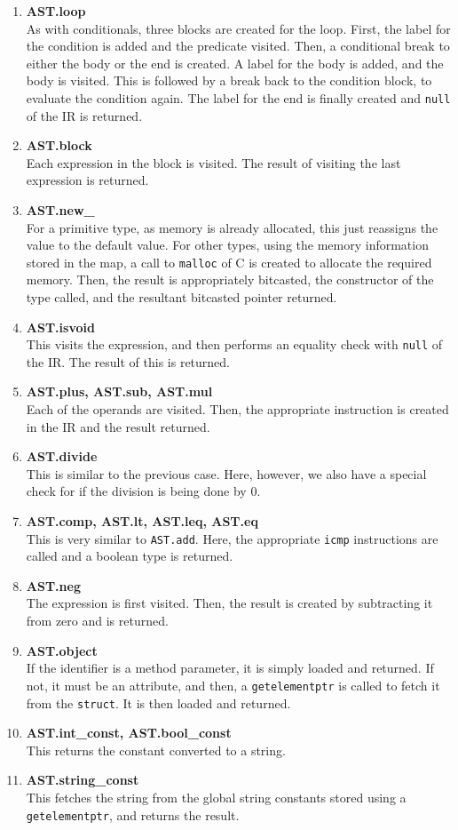 \documentclass{article}
\begin{document}
\begin{enumerate}
	\item \textbf{AST.loop} \\
	As with conditionals, three blocks are created for the loop. First, the label for the condition is added and the predicate visited. Then, a conditional break to either the body or the end is created. A label for the body is added, and the body is visited. This is followed by a break back to the condition block, to evaluate the condition again. The label for the end is finally created and \verb|null| of the IR is returned.
	\item \textbf{AST.block} \\
	Each expression in the block is visited. The result of visiting the last expression is returned.
	\item \textbf{AST.new\_} \\
	For a primitive type, as memory is already allocated, this just reassigns the value to the default value. For other types, using the memory information stored in the map, a call to \verb|malloc| of C is created to allocate the required memory. Then, the result is appropriately bitcasted, the constructor of the type called, and the resultant bitcasted pointer returned.
	\item \textbf{AST.isvoid} \\
	This visits the expression, and then performs an equality check with \verb|null| of the IR. The result of this is returned.
	\item \textbf{AST.plus, AST.sub, AST.mul} \\
	Each of the operands are visited. Then, the appropriate instruction is created in the IR and the result returned.
	\item \textbf{AST.divide} \\
	This is similar to the previous case. Here, however, we also have a special check for if the division is being done by 0.
	\item \textbf{AST.comp, AST.lt, AST.leq, AST.eq} \\
	This is very similar to \verb|AST.add|. Here, the appropriate \verb|icmp| instructions are called and a boolean type is returned.
	\item \textbf{AST.neg} \\
	The expression is first visited. Then, the result is created by subtracting it from zero and is returned.
	\item \textbf{AST.object} \\
	If the identifier is a method parameter, it is simply loaded and returned. If not, it must be an attribute, and then, a \verb|getelementptr| is called to fetch it from the \verb|struct|. It is then loaded and returned.
	\item \textbf{AST.int\_const, AST.bool\_const} \\
	This returns the constant converted to a string.
	\item \textbf{AST.string\_const} \\
	This fetches the string from the global string constants stored using a \verb|getelementptr|, and returns the result.
\end{enumerate}
\end{document}
